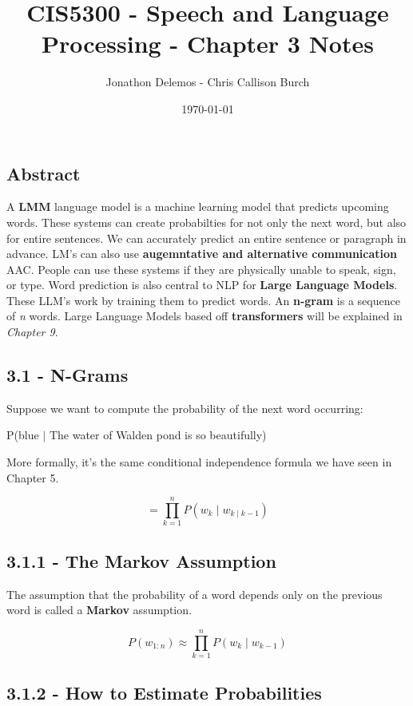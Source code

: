 \documentclass{article}
\title{CIS5300 - Speech and Language Processing - Chapter 3 Notes}
\author{Jonathon Delemos - Chris Callison Burch}
\date{\today}
\begin{document}
\maketitle

\subsection{Abstract}

A \textbf{LMM} language model is a machine learning model that predicts upcoming words.
These systems can create probabilties for not only the next word, but also for entire sentences.
We can accurately predict an entire sentence or paragraph in advance. LM's can also use \textbf{augemntative and alternative communication} AAC.
People can use these systems if they are physically unable to speak, sign, or type. Word prediction is also central to NLP for \textbf{Large Language Models}.
These LLM's work by training them to predict words. An \textbf{n-gram} is a sequence of \textit{n} words.
Large Language Models based off \textbf{transformers} will be explained in \textit{Chapter 9}.


\subsection{3.1 - N-Grams}

Suppose we want to compute the probability of the next word occurring: \newline

P(blue $\mid$ The water of Walden pond is so beautifully) \newline

More formally, it's the same conditional independence formula we have seen in Chapter 5.

\[
    = \prod_{k=1}^{n} P(w_k \mid w_{k \mid k-1})
\]

\subsection{3.1.1 - The Markov Assumption }

The assumption that the probability of a word depends only on the previous word is called a
\textbf{Markov} assumption.

\[
    P(w_{1:n}) \approx \prod_{k=1}^{n} P(w_k \mid w_{k-1})
\]

\subsection{3.1.2 - How to Estimate Probabilities}
\end{document}

